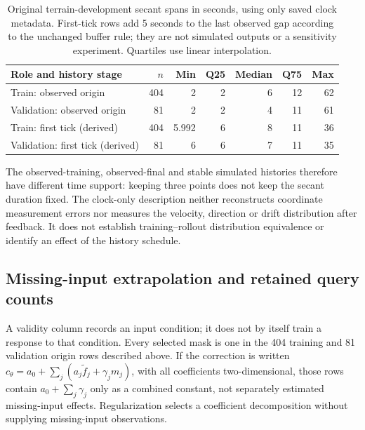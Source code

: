 \documentclass[11pt]{article}
\begin{document}
\begin{table}[htbp]
\centering\small
\caption{Original terrain-development secant spans in seconds, using only
saved clock metadata. First-tick rows add 5 seconds to the last observed
gap according to the unchanged buffer rule; they are not simulated outputs
or a sensitivity experiment. Quartiles use linear interpolation.}
\label{tab:development-history-spans}
\begin{tabular}{lrrrrrr}
\toprule
Role and history stage & \(n\) & Min & Q25 & Median & Q75 & Max\\
\midrule
Train: observed origin & 404 & 2 & 2 & 6 & 12 & 62\\
Validation: observed origin & 81 & 2 & 2 & 4 & 11 & 61\\
Train: first tick (derived) & 404 & 5.992 & 6 & 8 & 11 & 36\\
Validation: first tick (derived) & 81 & 6 & 6 & 7 & 11 & 35\\
\bottomrule
\end{tabular}
\end{table}

The observed-training, observed-final and stable simulated histories
therefore have different time support: keeping three points does not keep
the secant duration fixed. The clock-only description neither reconstructs
coordinate measurement errors nor measures the velocity, direction or drift
distribution after feedback. It does not establish training--rollout
distribution equivalence or identify an effect of the history schedule.

\subsection{Missing-input extrapolation and retained query counts}
\label{sec:missing-input-scope}
A validity column records an input condition; it does not by itself train a
response to that condition. Every selected mask is one in the 404 training
and 81 validation origin rows described above. If the correction is written
\(c_\theta=a_0+\sum_j(a_j\widetilde f_j+\gamma_j m_j)\), with all coefficients
two-dimensional, those rows contain \(a_0+\sum_j\gamma_j\) only as a combined
constant, not separately estimated missing-input effects.
Regularization selects a coefficient decomposition without supplying
missing-input observations.
\end{document}
